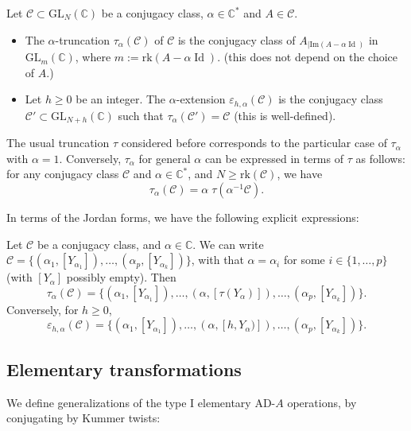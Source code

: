\documentclass[11pt,a4paper]{amsart}
\numberwithin{equation}{section}
\DeclareMathOperator{\Id}{Id}
\begin{document}
\begin{definition}
\label{def:truncation_variants}
Let $\mathcal C\subset \mathrm{GL}_N(\mathbb C)$ be a conjugacy class, $\alpha\in \mathbb C^*$ and $A\in \mathcal C$. 
\begin{itemize}
\item The $\alpha$-truncation $\tau_\alpha(\mathcal C)$ of $\mathcal C$ is the conjugacy class of $A_{\vert{\mathrm{Im}(A-\alpha\Id)}}$ in $\mathrm{GL}_{m}(\mathbb C)$, where $m:=\mathrm{rk}(A-\alpha\Id)$.  (this does not depend on the choice of $A$.)
\item Let $h\geq 0$ be an integer. The $\alpha$-extension $\varepsilon_{h,\alpha}(\mathcal C)$ is the conjugacy class $\mathcal C'\subset \mathrm{GL}_{N+h}(\mathbb C)$ such that $\tau_\alpha(\mathcal C')=\mathcal C$ (this is well-defined).
\end{itemize}
\end{definition}

\begin{remark}
The usual truncation $\tau$ considered before corresponds to the particular case of $\tau_\alpha$ with $\alpha=1$. Conversely, $\tau_\alpha$ for general $\alpha$ can be expressed in terms of $\tau$ as follows: for any conjugacy class $\mathcal C$ and $\alpha\in \mathbb C^*$, and $N\geq \mathrm{rk}(\mathcal C)$, we have
\[
\tau_{\alpha}(\mathcal C)=\alpha\;\tau(\alpha^{-1}\mathcal C).
\]
\end{remark}

In terms of the Jordan forms, we have the following explicit expressions:

\begin{lemma} Let 
 $\mathcal C$ be a conjugacy class, and $\alpha\in \mathbb C$. We can  write $\mathcal C=\{(\alpha_1, [Y_{\alpha_1}]), \dots, (\alpha_p, [Y_{\alpha_k}])\}$, with that $\alpha=\alpha_i$ for some $i\in \{1, \dots, p\}$ (with $[Y_{\alpha}]$ possibly empty). Then
 \[
 \tau_\alpha(\mathcal C)=\{(\alpha_1, [Y_{\alpha_1}]), \dots,(\alpha, [\tau(Y_\alpha)]), \dots,(\alpha_p, [Y_{\alpha_k}])\}.
 \]
Conversely, for $h\geq 0$, 
 \[
 \varepsilon_{h,\alpha}(\mathcal C)=\{(\alpha_1, [Y_{\alpha_1}]), \dots,(\alpha, [h,Y_\alpha)]), \dots,(\alpha_p, [Y_{\alpha_k}])\}.
 \]
\end{lemma}

\subsection{Elementary transformations}

We define generalizations of the type I elementary AD-$A$ operations, by conjugating by Kummer twists:
\end{document}
